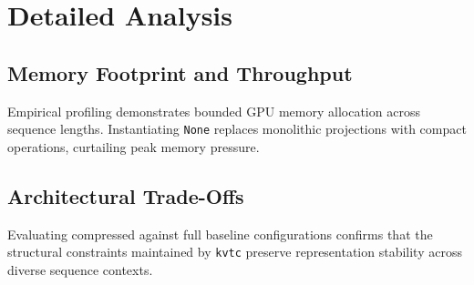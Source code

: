 \section{Detailed Analysis}

\subsection{Memory Footprint and Throughput}
Empirical profiling demonstrates bounded GPU memory allocation across sequence lengths. Instantiating \texttt{None} replaces monolithic projections with compact operations, curtailing peak memory pressure.

\subsection{Architectural Trade-Offs}
Evaluating compressed against full baseline configurations confirms that the structural constraints maintained by \texttt{kvtc} preserve representation stability across diverse sequence contexts.
